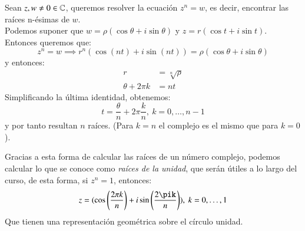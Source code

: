     \begin{eg}
        Sean $z, w \neq 0 \in \mathbb{C}$, queremos resolver la ecuación $z^n = w$, es decir, encontrar las raíces n-ésimas de $w$.\\
        Podemos suponer que $w = \rho(\cos \theta + i \sin \theta)$ y $z = r (\cos t + i \sin t)$. Entonces queremos que:
        $$
            z^n = w \implies r^n (\cos(nt) + i \sin(nt)) =  \rho(\cos \theta + i \sin \theta)
        $$
        y entonces:
        \begin{align*}
            r &= \sqrt[n]{\rho}\\
            \theta + 2\pi k &= nt
        \end{align*}
        Simplificando la última identidad, obtenemos:
        $$
            t = \frac{\theta}{n} + 2\pi \frac{k}{n},\ k=0, \ldots, n-1
        $$
        y por tanto resultan $n$ raíces. (Para $k=n$ el complejo es el mismo que para $k = 0$).
    \end{eg}
    Gracias a esta forma de calcular las raíces de un número complejo, podemos calcular lo que se conoce como \textit{raíces de la unidad}, que serán útiles a lo largo del curso, de esta forma, si $z^n = 1$, entonces:
    $$
        z = (\cos \pfrac{2\pi k}{n} + i\sin \pfrac{2\pik}{n}),\ k=0, \ldots, 1
    $$
    Que tienen una representación geométrica sobre el círculo unidad.

